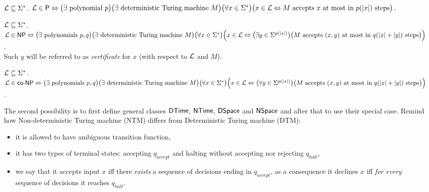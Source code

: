 		\begin{defn}\label{def:P}
			${\cal L} \subseteq \Sigma^*$. ${\cal L} \in \P \iff \bigl(\exists \textnormal{ polynomial } p \bigr) \bigl(\exists \textnormal{ deterministic Turing machine } M\bigr)\\ \bigl(\forall x \in \Sigma^*\bigr) \bigl(x \in {\cal L} \iff M \textnormal{ accepts } x \textnormal{ at most in } p(|x|) \textnormal{ steps} \bigr)$.
		\end{defn}
		
		\begin{defn}\label{def:NP}
			${\cal L} \subseteq \Sigma^*$. ${\cal L} \in \NP \iff \bigl(\exists \textnormal{ polynomials } p, q \bigr) \bigl(\exists \textnormal{ deterministic Turing machine } M\bigr)\\ \bigl(\forall x \in \Sigma^*\bigr) \Bigl(x \in {\cal L} \iff \bigl(\exists y \in \Sigma^{p(|x|)}\bigr) \bigl(M \textnormal{ accepts } (x,y) \textnormal{ at most in } q(|x|+|y|) \textnormal{ steps} \bigr)\Bigr)$.\\
			Such $y$ will be referred to as {\em certificate} for $x$ (with respect to $\cal L$ and $M$).
		\end{defn}
		
		\begin{defn}\label{def:coNP}
			${\cal L} \subseteq \Sigma^*$. ${\cal L} \in \coNP \iff \bigl(\exists \textnormal{ polynomials } p, q \bigr) \bigl(\exists \textnormal{ deterministic Turing machine } M\bigr)\\ \bigl(\forall x \in \Sigma^*\bigr) \Bigl(x \in {\cal L} \iff \bigl(\forall y \in \Sigma^{p(|x|)}\bigr) \bigl(M \textnormal{ accepts } (x,y) \textnormal{ at most in } q(|x|+|y|) \textnormal{ steps} \bigr)\Bigr)$.
		\end{defn}
		
		The second possibility is to first define general classes $\DTime$, $\NTime$, $\DSpace$ and $\NSpace$ and after that to use their special case. Remind how Non-deterministic Turing machine (NTM) differs from Deterministic Turing machine (DTM):
		\begin{itemize}
			\item it is allowed to have ambiguous transition function,
			\item it has two types of terminal states: accepting $q_{accept}$ and halting without accepting nor rejecting $q_{halt}$,
			\item we say that it accepts input $x$ iff there {\em exists} a sequence of decisions ending in $q_{accept}$, as a consequence it declines $x$ iff {\em for every} sequence of decisions it reaches $q_{halt}$.
		\end{itemize}
		
